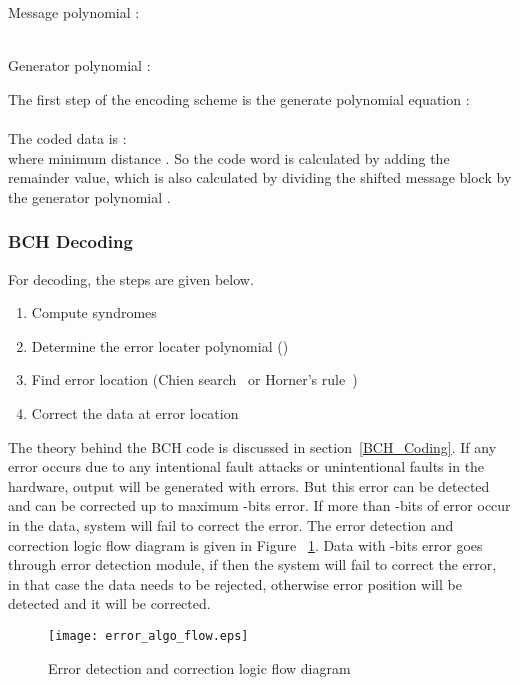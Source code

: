 \documentclass[10pt, conference, compsocconf]{IEEEtran}
\begin{document}
Message polynomial :

 \\
Generator polynomial : 



The first step of the encoding scheme is the generate polynomial equation : \\
 
\\ The coded data is : \\  where minimum distance .
So the code word is calculated by adding the remainder value, which is also calculated by dividing the shifted message block by the generator polynomial . 
\subsubsection{BCH Decoding}
For decoding, the steps are given below.

\begin{enumerate}
    \item Compute syndromes
    \item Determine the error locater polynomial ()
      \item Find error location (Chien search~\cite{chien:search} or Horner's rule~\cite{horner:search})
            \item Correct the data at error location
      \end{enumerate}
      
The theory behind the BCH code is discussed in section~\ref{BCH_Coding}. If any error occurs due to any intentional fault attacks or unintentional faults in the hardware, output will be generated with errors. But this error can be detected and can be corrected up to maximum -bits error. If more than -bits of error occur in the data, system will fail to correct the error.
The error detection and correction logic flow diagram is given in Figure ~\ref{fig:ErrorAlgoFlow}. Data with -bits error goes through error detection module, if  then the system will fail to correct the error, in that case the data needs to be rejected, otherwise error position will be detected and it will be corrected. 
\begin{figure}[h]
\centering
\texttt{[image: error\_algo\_flow.eps]}
\caption{Error detection and correction logic flow diagram}
\label{fig:ErrorAlgoFlow}
\end{figure}
\fi
\end{document}

